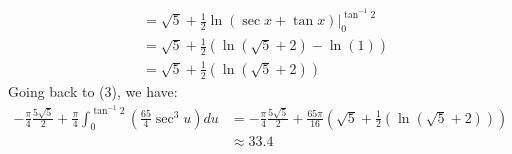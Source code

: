 \documentclass{article}
\begin{document}
\begin{enumerate}[label=\alph*)]
\begin{align*}
        &=\sqrt{5} + \frac{1}{2} \ln(\sec x + \tan x) \big|^{\tan^{-1}2}_0 \\
        &=\sqrt{5} + \frac{1}{2}(\ln(\sqrt 5 + 2) - \ln(1)) \\
        &=\sqrt{5} + \frac{1}{2}(\ln(\sqrt 5 + 2))
    \end{align*}
    Going back to (3), we have:
    \begin{align*}
        -\frac{\pi}{4}\frac{5\sqrt{5}}{2} +\frac{\pi}{4}\int^{\tan^{-1}2}_0 \left(\frac{65}{4}\sec^3u\right) du &=
        -\frac{\pi}{4}\frac{5\sqrt{5}}{2} +
        \frac{65\pi}{16} (\sqrt{5} + \frac{1}{2}(\ln(\sqrt 5 + 2)))\\
        &\approx 33.4
    \end{align*}
\end{enumerate}

\pagebreak
\end{document}
